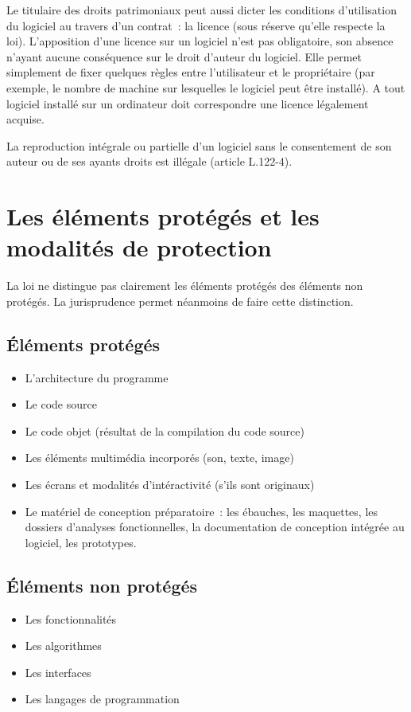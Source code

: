 \documentclass[pdftex,a4paper,11pt]{report}
\begin{document}
Le titulaire des droits patrimoniaux peut aussi dicter les conditions d'utilisation du logiciel au travers d'un contrat~: la licence (sous réserve qu'elle respecte la loi). L'apposition d'une licence sur un logiciel n'est pas obligatoire, son absence n'ayant aucune conséquence sur le droit d'auteur du logiciel. Elle permet simplement de fixer quelques règles entre l'utilisateur et le propriétaire (par exemple, le nombre de machine sur lesquelles le logiciel peut être installé). A tout logiciel installé sur un ordinateur doit correspondre une licence légalement acquise.

La reproduction intégrale ou partielle d'un logiciel sans le consentement de son auteur ou de ses ayants droits est illégale (article L.122-4).

\section{Les éléments protégés et les modalités de protection}
La loi ne distingue pas clairement les éléments protégés des éléments non protégés. La jurisprudence permet néanmoins de faire cette distinction.

\subsection{Éléments protégés}
\begin{itemize}
\item L'architecture du programme
\item Le code source
\item Le code objet (résultat de la compilation du code source)
\item Les éléments multimédia incorporés (son, texte, image)
\item Les écrans et modalités d'intéractivité (s'ils sont originaux)
\item Le matériel de conception préparatoire~: les ébauches, les maquettes, les dossiers d'analyses fonctionnelles, la documentation de conception intégrée au logiciel, les prototypes.
\end{itemize}

\subsection{Éléments non protégés}
\begin{itemize}
\item Les fonctionnalités
\item Les algorithmes
\item Les interfaces
\item Les langages de programmation
\end{itemize}
\end{document}
